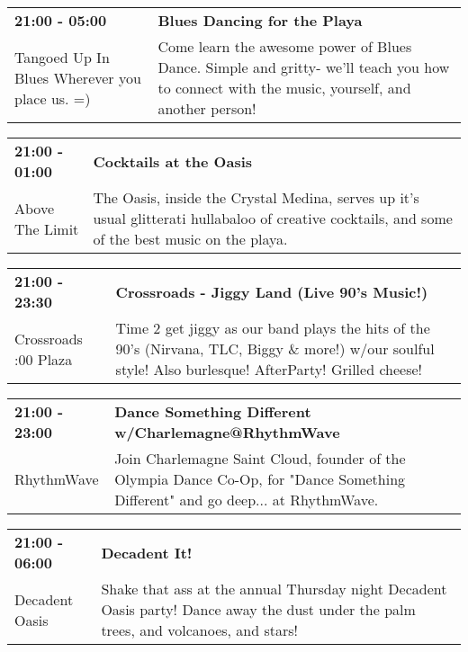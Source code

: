 \begin{tabular}{ p{1in} p{2.2in} }
    \textbf{21:00 - 05:00} & \textbf{Blues Dancing for the Playa} \\
    Tangoed Up In Blues \newline Wherever you place us. =) & Come learn the awesome power of Blues Dance. Simple and gritty- we'll teach you how to connect with the music, yourself, and another person! \\
    \hline 
\end{tabular}
    
\begin{tabular}{ p{1in} p{2.2in} }
    \textbf{21:00 - 01:00} & \textbf{Cocktails at the Oasis} \\
    Above The Limit \newline  & The Oasis, inside the Crystal Medina, serves up it's usual glitterati hullabaloo of creative cocktails, and some of the best music on the playa. \\
    \hline 
\end{tabular}
    
\begin{tabular}{ p{1in} p{2.2in} }
    \textbf{21:00 - 23:30} & \textbf{Crossroads - Jiggy Land (Live 90's Music!)} \\
    Crossroads \newline 9:00 Plaza & Time 2 get jiggy as our band plays the hits of the 90's (Nirvana, TLC, Biggy \& more!) w/our soulful style! Also burlesque! AfterParty! Grilled cheese! \\
    \hline 
\end{tabular}
    
\begin{tabular}{ p{1in} p{2.2in} }
    \textbf{21:00 - 23:00} & \textbf{Dance Something Different w/Charlemagne@RhythmWave} \\
    RhythmWave \newline  & Join Charlemagne Saint Cloud, founder of the Olympia Dance Co-Op, for "Dance Something Different" and go deep... at RhythmWave. \\
    \hline 
\end{tabular}
    
\begin{tabular}{ p{1in} p{2.2in} }
    \textbf{21:00 - 06:00} & \textbf{Decadent It!} \\
    Decadent Oasis \newline  & Shake that ass at the annual Thursday night Decadent Oasis party!  Dance away the dust under the palm trees, and volcanoes,  and stars! \\
    \hline 
\end{tabular}
    
